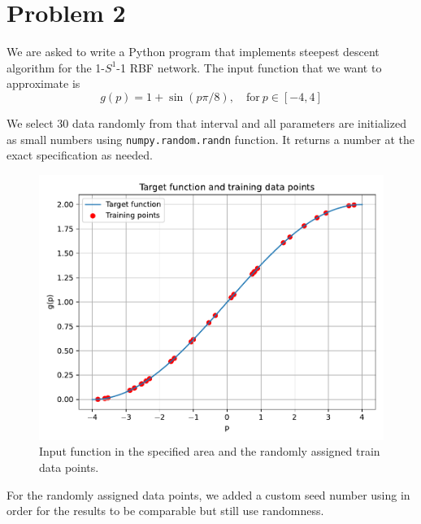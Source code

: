 \section{Problem 2}

We are asked to write a Python program that implements steepest descent algorithm for the 1-$S^1$-1 RBF network.
The input function that we want to approximate is 
\[
g(p) = 1 + \sin\left(p\pi/8\right), \quad \text{for} \ p \in \left[-4,4\right]
\]

We select 30 data randomly from that interval and all parameters are initialized as small numbers using \verb|numpy.random.randn| function. It returns a number at the exact specification as needed.

\begin{figure}[htbp]
	\centering
	\includegraphics[width=0.6\linewidth]{../Problem 2/prob2_targetFunc_dataPoints.pdf}
	\caption{Input function in the specified area and the randomly assigned train data points.}
\end{figure}

For the randomly assigned data points, we added a custom seed number using in order for the results to be comparable but still use randomness.

